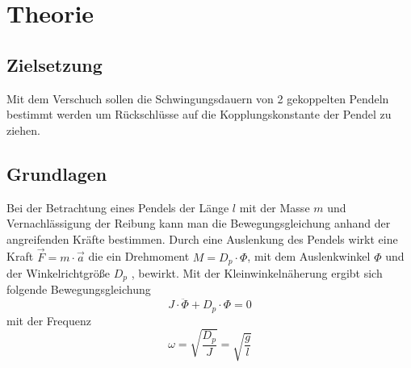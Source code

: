 \section{Theorie}
\label{sec:theorie}
\subsection{Zielsetzung}
Mit dem Verschuch sollen die Schwingungsdauern von 2 gekoppelten Pendeln bestimmt werden um Rückschlüsse auf die Kopplungskonstante der Pendel zu ziehen.
\subsection{Grundlagen}
Bei der Betrachtung eines Pendels der Länge $l$ mit der Masse $m$ und Vernachlässigung der Reibung kann man die Bewegungsgleichung anhand der angreifenden Kräfte bestimmen.
Durch eine Auslenkung des Pendels wirkt eine Kraft $\vec{F} = m\cdot \vec{a}$ die ein Drehmoment    $ M = D_p \cdot \Phi$,
mit dem Auslenkwinkel  $\Phi$ und der Winkelrichtgröße $D_p$ , bewirkt.
Mit der Kleinwinkelnäherung ergibt sich folgende Bewegungsgleichung 
\begin{equation}
    J\cdot \ddot{\Phi} + D_p \cdot \Phi = 0
\end{equation}
mit der Frequenz 
\begin{equation}
    \omega = \sqrt{\frac{D_p}{J}}=\sqrt{\frac{g}{l}}
\end{equation}
